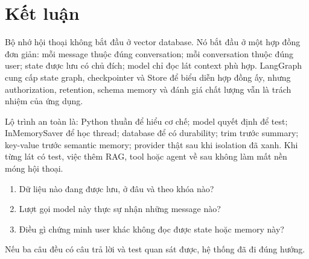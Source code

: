 \chapter*{Kết luận}

Bộ nhớ hội thoại không bắt đầu ở vector database. Nó bắt đầu ở một hợp đồng đơn giản: mỗi message
thuộc đúng conversation; mỗi conversation thuộc đúng user; state được lưu có chủ đích; model chỉ
đọc lát context phù hợp. LangGraph cung cấp state graph, checkpointer và Store để biểu diễn hợp đồng
ấy, nhưng authorization, retention, schema memory và đánh giá chất lượng vẫn là trách nhiệm của
ứng dụng.

Lộ trình an toàn là: Python thuần để hiểu cơ chế; model quyết định để test; InMemorySaver để học
thread; database để có durability; trim trước summary; key-value trước semantic memory; provider
thật sau khi isolation đã xanh. Khi từng lát có test, việc thêm RAG, tool hoặc agent về sau không
làm mất nền móng hội thoại.

\begin{aicheckpoint}
\begin{enumerate}
  \item Dữ liệu nào đang được lưu, ở đâu và theo khóa nào?
  \item Lượt gọi model này thực sự nhận những message nào?
  \item Điều gì chứng minh user khác không đọc được state hoặc memory này?
\end{enumerate}
Nếu ba câu đều có câu trả lời và test quan sát được, hệ thống đã đi đúng hướng.
\end{aicheckpoint}
